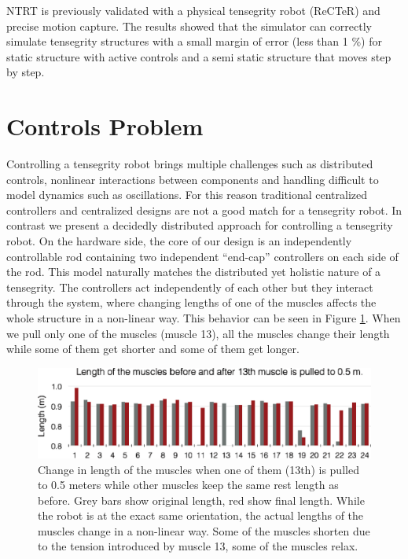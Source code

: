 \documentclass[twocolumn,10pt]{asme2ej}
\begin{document}
NTRT is previously validated with a physical tensegrity robot (ReCTeR) and precise motion capture. The results showed that the simulator can correctly simulate tensegrity structures with a small margin of error (less than 1 \%) for static structure with active controls and a semi static structure that moves step by step. 

\section{Controls Problem}
\label{sec:platform}

Controlling a tensegrity robot brings multiple challenges such as distributed controls, nonlinear interactions between components and handling difficult to model dynamics such as oscillations. For this reason traditional centralized controllers and centralized designs are not a good match for a tensegrity robot. In contrast we present a decidedly distributed approach for controlling a tensegrity robot. On the hardware side, the core of our design is an independently controllable rod containing two independent ``end-cap'' controllers on each side of the rod. This model naturally matches the distributed yet holistic nature of a tensegrity. The controllers act independently of each other but they interact through the system, where changing lengths of one of the muscles affects the whole structure in a non-linear way. This behavior can be seen in Figure
\ref{fig:nonlinear}. When we pull only one of the muscles (muscle 13), all the muscles change their length while some of them get shorter and some of them get longer. 

\begin{figure}[t]
\centering
\includegraphics[width=\columnwidth]{results/actuate1/actuate1.eps}
\caption{Change in length of the muscles when one of them (13th) is pulled to 0.5 meters while other muscles keep the same rest length as before.  Grey bars show original length, red show final length. While the robot is at the exact same orientation, the actual lengths of the muscles change in a non-linear way.  Some of the muscles shorten due to the tension introduced by muscle 13, some of the muscles relax.}
\label{fig:nonlinear}
\end{figure}
\end{document}
